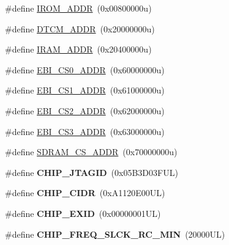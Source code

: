 \begin{DoxyCompactItemize}
\item 
\#define \mbox{\hyperlink{group__SAMS70N21__definitions_ga694212ffb8c2786bacee3d0ad6020bda}{I\+R\+O\+M\+\_\+\+A\+D\+DR}}~(0x00800000u)
\item 
\#define \mbox{\hyperlink{group__SAMS70N21__definitions_ga26626a425f7ebb3a0c2dbc276f0d9f78}{D\+T\+C\+M\+\_\+\+A\+D\+DR}}~(0x20000000u)
\item 
\#define \mbox{\hyperlink{group__SAMS70N21__definitions_gaae45ac2ef16942159481c767ac4805cf}{I\+R\+A\+M\+\_\+\+A\+D\+DR}}~(0x20400000u)
\item 
\#define \mbox{\hyperlink{group__SAMS70N21__definitions_ga9bcbb97ddae3b2cc5e2c9613d33f66b4}{E\+B\+I\+\_\+\+C\+S0\+\_\+\+A\+D\+DR}}~(0x60000000u)
\item 
\#define \mbox{\hyperlink{group__SAMS70N21__definitions_gaaddd9fdbbc77c9aced5308819f502a26}{E\+B\+I\+\_\+\+C\+S1\+\_\+\+A\+D\+DR}}~(0x61000000u)
\item 
\#define \mbox{\hyperlink{group__SAMS70N21__definitions_ga058a35f9991487dc2dd12ada792d0730}{E\+B\+I\+\_\+\+C\+S2\+\_\+\+A\+D\+DR}}~(0x62000000u)
\item 
\#define \mbox{\hyperlink{group__SAMS70N21__definitions_gad66ebdd0fc33ec3cf85dbaa14bbf05d9}{E\+B\+I\+\_\+\+C\+S3\+\_\+\+A\+D\+DR}}~(0x63000000u)
\item 
\#define \mbox{\hyperlink{group__SAMS70N21__definitions_ga61b7db25daf759c2a2beb6e5a0b57a84}{S\+D\+R\+A\+M\+\_\+\+C\+S\+\_\+\+A\+D\+DR}}~(0x70000000u)
\item 
\mbox{\label{group__SAMS70N21__definitions_gaa614519778eec0df55d3eeab3223e3f6}} 
\#define {\bfseries C\+H\+I\+P\+\_\+\+J\+T\+A\+G\+ID}~(0x05\+B3\+D03\+F\+U\+L)
\item 
\mbox{\label{group__SAMS70N21__definitions_ga1e1ae44dd9269a8a98c1d7e7a60e9fbd}} 
\#define {\bfseries C\+H\+I\+P\+\_\+\+C\+I\+DR}~(0x\+A1120\+E00\+U\+L)
\item 
\mbox{\label{group__SAMS70N21__definitions_ga35123717aa86b76bb6b73cf3adc4c2e6}} 
\#define {\bfseries C\+H\+I\+P\+\_\+\+E\+X\+ID}~(0x00000001\+U\+L)
\item 
\mbox{\label{group__SAMS70N21__definitions_ga0e868bf27426399dfdcb3a9dfc3733c4}} 
\#define {\bfseries C\+H\+I\+P\+\_\+\+F\+R\+E\+Q\+\_\+\+S\+L\+C\+K\+\_\+\+R\+C\+\_\+\+M\+IN}~(20000\+U\+L)

\end{DoxyCompactItemize}
